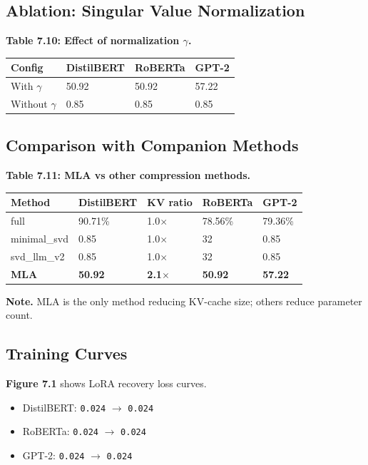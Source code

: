 \subsection{Ablation: Singular Value Normalization}

\textbf{Table 7.10: Effect of normalization $\gamma$.}

\begin{table}[H]
\centering
\small
\begin{tabular}{llll}
\toprule
\textbf{Config} & \textbf{DistilBERT} & \textbf{RoBERTa} & \textbf{GPT-2} \\
\midrule
With $\gamma$ & 50.92 & 50.92 & 57.22 \\
Without $\gamma$ & 0.85 & 0.85 & 0.85 \\
\bottomrule
\end{tabular}
\end{table}

\subsection{Comparison with Companion Methods}

\textbf{Table 7.11: MLA vs other compression methods.}

\begin{table}[H]
\centering
\small
\begin{tabular}{lllll}
\toprule
\textbf{Method} & \textbf{DistilBERT} & \textbf{KV ratio} & \textbf{RoBERTa} & \textbf{GPT-2} \\
\midrule
full & 90.71\% & 1.0$\times$ & 78.56\% & 79.36\% \\
minimal\_svd & 0.85 & 1.0$\times$ & 32 & 0.85 \\
svd\_llm\_v2 & 0.85 & 1.0$\times$ & 32 & 0.85 \\
\textbf{MLA} & \textbf{50.92} & \textbf{2.1$\times$} & \textbf{50.92} & \textbf{57.22} \\
\bottomrule
\end{tabular}
\end{table}

\textbf{Note.} MLA is the only method reducing KV-cache size; others reduce 
parameter count.

\subsection{Training Curves}

\textbf{Figure 7.1} shows LoRA recovery loss curves.

\begin{itemize}
\item DistilBERT: \texttt{0.024} $\to$ \texttt{0.024}
\item RoBERTa: \texttt{0.024} $\to$ \texttt{0.024}
\item GPT-2: \texttt{0.024} $\to$ \texttt{0.024}

\end{itemize}
